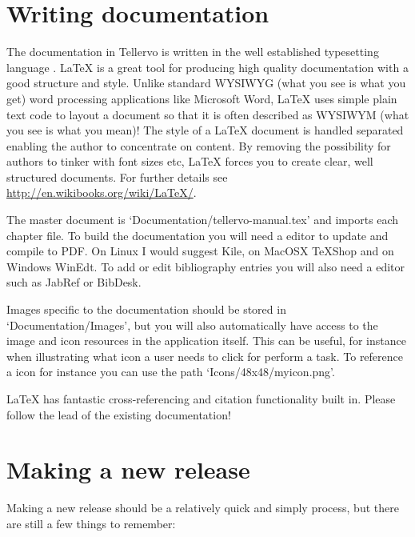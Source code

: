 \section{Writing documentation}
The documentation in Tellervo is written in the well established typesetting language {\LaTeXe}.  {\LaTeX} is a great tool for producing high quality documentation with a good structure and style.  Unlike standard WYSIWYG (what you see is what you get) word processing applications like Microsoft Word, {\LaTeX} uses simple plain text code to layout a document so that it is often described as WYSIWYM (what you see is what you mean)!  The style of a {\LaTeX} document is handled separated enabling the author to concentrate on content.  By removing the possibility for authors to tinker with font sizes etc, {\LaTeX} forces you to create clear, well structured documents.  For further details see \url{http://en.wikibooks.org/wiki/LaTeX/}.

The master document is `Documentation/tellervo-manual.tex' and imports each chapter file.  To build the documentation you will need a editor to update and compile to PDF.  On Linux I would suggest Kile, on MacOSX TeXShop and on Windows WinEdt.  To add or edit bibliography entries you will also need a {\BibTeX} editor such as JabRef or BibDesk.

Images specific to the documentation should be stored in `Documentation/Images', but you will also automatically have access to the image and icon resources in the application itself.  This can be useful, for instance when illustrating what icon a user needs to click for perform a task.  To reference a icon for instance you can use the path `Icons/48x48/myicon.png'.

{\LaTeX} has fantastic cross-referencing and citation functionality built in.  Please follow the lead of the existing documentation!


\section{Making a new release}
Making a new release should be a relatively quick and simply process, but there are still a few things to remember:

